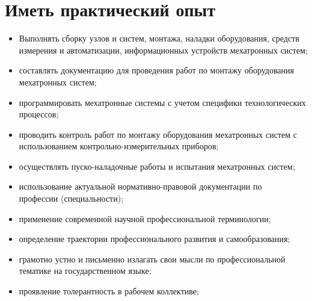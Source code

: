 \section*{Иметь практический опыт}
\begin{itemize}
\item Выполнять сборку узлов и систем, монтажа, наладки оборудования, средств измерения и автоматизации, информационных устройств мехатронных систем;
\item составлять документацию для проведения работ по монтажу оборудования мехатронных систем;
\item программировать мехатронные системы с учетом специфики технологических процессов;
\item проводить контроль работ по монтажу оборудования мехатронных систем с использованием контрольно-измерительных приборов;
\item осуществлять пуско-наладочные работы и испытания мехатронных систем;
\item использование актуальной нормативно-правовой документации по \\ профессии (специальности);
\item применение современной научной профессиональной терминологии;
\item определение траектории профессионального развития и самообразования;
\item грамотно устно и письменно излагать свои мысли по профессиональной тематике на государственном языке;
\item проявление толерантность в рабочем коллективе;
\end{itemize}

